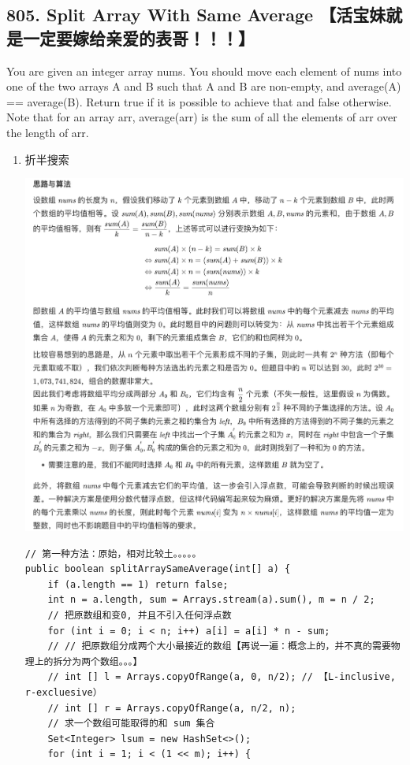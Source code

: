 \documentclass[9pt, b5paaper]{book}
\begin{document}
\subsection{805. Split Array With Same Average 【活宝妹就是一定要嫁给亲爱的表哥！！！】}
\label{sec-1-4-1}
You are given an integer array nums.
You should move each element of nums into one of the two arrays A and B such that A and B are non-empty, and average(A) == average(B).
Return true if it is possible to achieve that and false otherwise.
Note that for an array arr, average(arr) is the sum of all the elements of arr over the length of arr.
\begin{enumerate}
\item 折半搜索
\label{sec-1-4-1-1}

\includegraphics[width=.9\linewidth]{./pic/dp_20230414_202227.png}
\begin{verbatim}
// 第一种方法：原始，相对比较土。。。。。
public boolean splitArraySameAverage(int[] a) {
    if (a.length == 1) return false;
    int n = a.length, sum = Arrays.stream(a).sum(), m = n / 2;
    // 把原数组和变0, 并且不引入任何浮点数
    for (int i = 0; i < n; i++) a[i] = a[i] * n - sum;
    // // 把原数组分成两个大小最接近的数组【再说一遍：概念上的，并不真的需要物理上的拆分为两个数组。。。】
    // int [] l = Arrays.copyOfRange(a, 0, n/2); // 【L-inclusive, r-excluesive）
    // int [] r = Arrays.copyOfRange(a, n/2, n);
    // 求一个数组可能取得的和 sum 集合
    Set<Integer> lsum = new HashSet<>();
    for (int i = 1; i < (1 << m); i++) {

\end{verbatim}
\end{enumerate}
\end{document}
